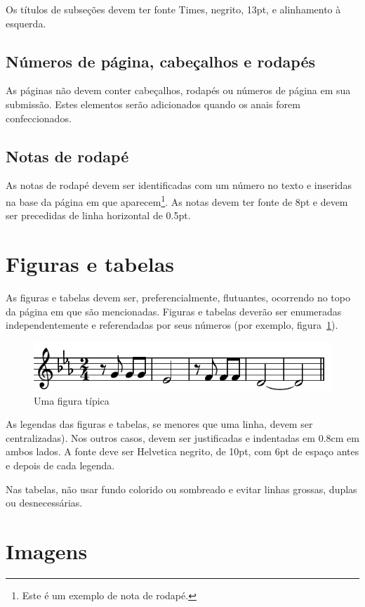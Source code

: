 \documentclass[12pt]{article}
\begin{document}
Os títulos de subseções devem ter fonte Times, negrito, 13pt, e
alinhamento à esquerda.

\subsection{Números de página, cabeçalhos e rodapés}

As páginas não devem conter cabeçalhos, rodapés ou números de página em sua submissão.
Estes elementos serão adicionados quando os anais forem
confeccionados.

\subsection{Notas de rodapé}

As notas de rodapé devem ser identificadas com um número no texto e
inseridas na base da página em que aparecem\footnote{Este é um exemplo
  de nota de rodapé.}. As notas devem ter fonte de 8pt e devem ser
precedidas de linha horizontal de 0.5pt.

\section{Figuras e tabelas}
\label{sec:figuras-e-tabelas}

As figuras e tabelas devem ser, preferencialmente, flutuantes,
ocorrendo no topo da página em que são mencionadas. Figuras e tabelas
deverão ser enumeradas independentemente e referendadas por seus
números (por exemplo, figura~\ref{fig:exampleFig}).

\begin{figure}
\centering
\includegraphics[width=.5\textwidth]{beethoven}
\caption{Uma figura típica}
\label{fig:exampleFig}
\end{figure}

As legendas das figuras e tabelas, se menores que uma linha, devem ser
centralizadas). Nos outros casos, devem ser justificadas e indentadas
em 0.8cm em ambos lados. A fonte deve ser Helvetica negrito, de 10pt,
com 6pt de espaço antes e depois de cada legenda.

Nas tabelas, não usar fundo colorido ou sombreado e evitar linhas
grossas, duplas ou desnecessárias.


\section{Imagens}
\end{document}
